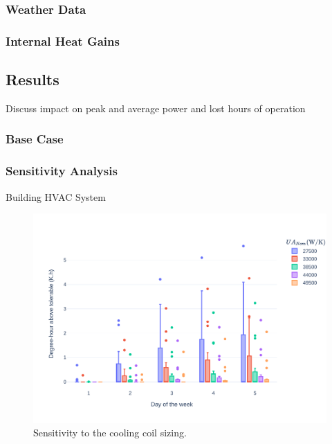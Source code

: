 \subsubsection{Weather Data} \label{sec:weather}



\subsubsection{Internal Heat Gains} \label{sec:gains}


\subsection{Results} \label{sec:results}

Discuss impact on peak and average power and lost hours of operation

\subsubsection{Base Case} \label{sec:base}


\subsubsection{Sensitivity Analysis} \label{sec:sensitivity}

Building HVAC System

\begin{figure}[h!]
\centering
\includegraphics[width=\linewidth]{figures/CoilSizing.pdf}
\caption{Sensitivity to the cooling coil sizing.}
\label{fig:fan}
\end{figure}

